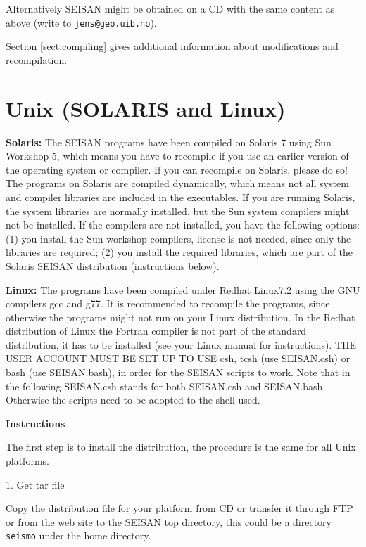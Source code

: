 Alternatively SEISAN might be obtained on a CD with the same content as 
above (write to \newline
\texttt{jens@geo.uib.no}). 

Section \ref{sect:compiling} gives additional information about modifications and recompilation. 

\section{Unix (SOLARIS and Linux)} 
\label{sect:instal-unix}

\textbf{Solaris:} The SEISAN programs have been compiled on Solaris 7 using Sun Workshop 5, which means you have to recompile if you use an earlier version of the operating system or compiler. If you can recompile on Solaris, please do so! The programs on Solaris are compiled dynamically, which means not all system and compiler libraries are included in the executables. If you are running Solaris, the system libraries are normally installed, but the Sun system compilers might not be installed. If the compilers are not installed, you have the following options: (1) you install the Sun workshop compilers, license is not needed, since only the libraries are required; (2) you install the required libraries, which are part of the Solaris SEISAN distribution (instructions below).  

\textbf{Linux:} The programs have been compiled under Redhat Linux7.2 
using the GNU compilers gcc and g77. It is recommended to recompile 
the programs, since otherwise the programs might not run on your 
Linux distribution. In the Redhat distribution of Linux the Fortran 
compiler is not part of the standard distribution, it has to be 
installed (see your Linux manual for instructions). 
THE USER ACCOUNT MUST BE SET UP TO USE csh, tcsh (use SEISAN.csh) or bash (use SEISAN.bash),
in order for the SEISAN scripts to work. 
Note that in the following SEISAN.csh stands for both SEISAN.csh and SEISAN.bash.
Otherwise the scripts need to be adopted to the shell used.


\textbf{Instructions}

The first step is to install the distribution, the procedure is the same for all Unix platforms. 

1.  Get tar file 

Copy the distribution file for your platform from CD or transfer it 
through FTP or from the web site to the SEISAN top directory, 
this could be a directory \texttt{seismo} under the home directory. 

